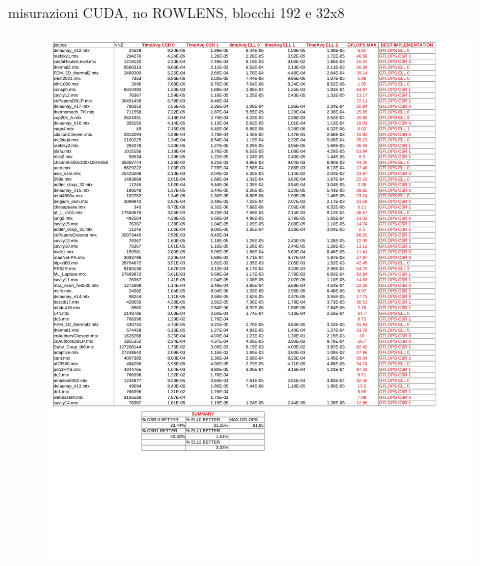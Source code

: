\documentclass[aspectratio=1610]{beamer}
\begin{document}
\begin{frame}[t]{misurazioni CUDA, no ROWLENS, blocchi 192 e 32x8}
	\begin{figure}[h!]  \centering
        \includegraphics[scale=0.27]{cudaNoRowLens_192_8.pdf}
    \end{figure}
\end{frame}
\end{document}
